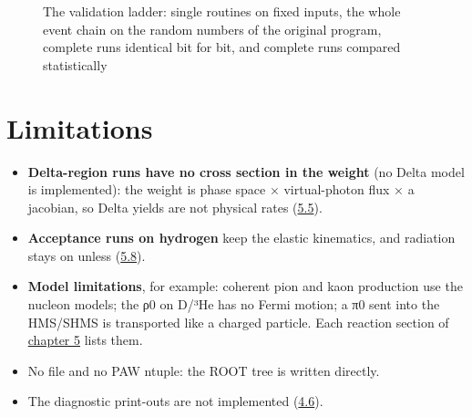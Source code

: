 \begin{figure}[htbp]
\caption[The validation ladder]{The validation ladder: single routines on fixed inputs, the whole event chain on the random numbers of the original program, complete runs identical bit for bit, and complete runs compared statistically}\label{fig:validationu5fladder}
\end{figure}
\section{\texorpdfstring{Limitations}{Limitations}}\label{user_manual-01u5fintroduction:15-limitations}
\begin{itemize}
\item \textbf{Delta-region runs have no cross section in the weight} (no Delta model is implemented): the weight is phase space ×
virtual-photon flux × a jacobian, so Delta yields are not physical rates (\hyperref[user_manual-05u5freactions:55-eepu3c0-in-the-delta-region-doingu5fdelta]{5.5}).
\item \textbf{Acceptance runs on hydrogen} keep the elastic kinematics, and radiation stays on unless 
(\hyperref[user_manual-05u5freactions:58-phase-space-and-acceptance-runs-doingu5fphsp]{5.8}).
\item \textbf{Model limitations}, for example: coherent pion and kaon production use the nucleon models; the ρ0 on D/³He has no
Fermi motion; a π0 sent into the HMS/SHMS is transported like a charged particle. Each reaction section of
\hyperref[user_manual-05u5freactions]{chapter 5} lists them.
\item No  file and no PAW ntuple: the ROOT tree is written directly.
\item The  diagnostic print-outs are not implemented (\hyperref[user_manual-04u5finputs:46-parameter-reference]{4.6}).
\end{itemize}

